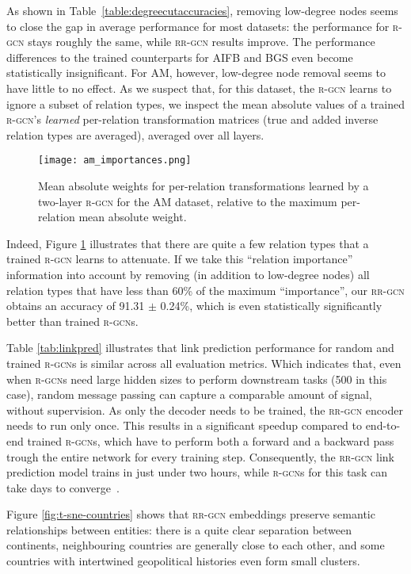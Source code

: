 \documentclass{llncs}
\begin{document}
As shown in Table~\ref{table:degreecutaccuracies}, removing low-degree nodes seems to close the gap in average performance for most datasets: the performance for \textsc{r-gcn} stays roughly the same, while \textsc{rr-gcn} results improve. The performance differences to the trained counterparts for AIFB and BGS even become statistically insignificant. For AM, however, low-degree node removal seems to have little to no effect. As we suspect that, for this dataset, the \textsc{r-gcn} learns to ignore a subset of relation types, we inspect the mean absolute values of a trained \textsc{r-gcn}'s \textit{learned} per-relation transformation matrices (true and added inverse relation types are averaged), averaged over all layers. 
\begin{figure}[t]
    \centering
    \texttt{[image: am\_importances.png]}
    \caption{Mean absolute weights for per-relation transformations learned by a two-layer \textsc{r-gcn} for the AM dataset, relative to the maximum per-relation mean absolute weight.}
    \label{fig:amimportances}
\end{figure}
Indeed, Figure \ref{fig:amimportances} illustrates that there are quite a few relation types that a trained \textsc{r-gcn} learns to attenuate. If we take this ``relation importance'' information into account by removing (in addition to low-degree nodes) all relation types that have less than 60\% of the maximum ``importance'', our \textsc{rr-gcn} obtains an accuracy of 91.31 $\pm$ 0.24\%, which is even statistically significantly better than trained \textsc{r-gcn}s.

Table \ref{tab:linkpred} illustrates that link prediction performance for random and trained \textsc{r-gcn}s is similar across all evaluation metrics. Which indicates that, even when \textsc{r-gcn}s need large hidden sizes to perform downstream tasks (500 in this case), random message passing can capture a comparable amount of signal, without supervision. As only the decoder needs to be trained, the \textsc{rr-gcn} encoder needs to run only once. This results in a significant speedup compared to end-to-end trained \textsc{r-gcn}s, which have to perform both a forward and a backward pass trough the entire network for every training step. Consequently, the \textsc{rr-gcn} link prediction model trains in just under two hours, while \textsc{r-gcn}s for this task can take days to converge~\cite{thanapalasingam2021relational}.

Figure \ref{fig:t-sne-countries} shows that \textsc{rr-gcn} embeddings preserve semantic relationships between entities: there is a quite clear separation between continents, neighbouring countries are generally close to each other, and some countries with intertwined geopolitical histories even form small clusters.
\end{document}
